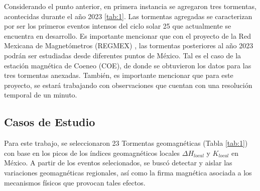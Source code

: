 \documentclass[preprint,12pt]{article}
\begin{document}
Considerando el punto anterior, en primera instancia se agregaron tres tormentas, acontecidas durante el año 2023 \ref{tab:1}. Las tormentas agregadas se caracterizan por ser los primeros eventos intensos del ciclo solar 25 que actualmente se encuentra en desarrollo. Es importante mencionar que con el proyecto de la Red Mexicana de Magnetómetros (REGMEX) \cite{corona2024}, las tormentas posteriores al año 2023 podrán ser estudiadas desde diferentes puntos de México. Tal es el caso de la estación magnética de Coeneo (COE), de donde se obtuvieron los datos para las tres tormentas anexadas. También, es importante mencionar que para este proyecto, se estará trabajando con observaciones que cuentan con una resolución temporal de un minuto.\\ 

\subsection{Casos de Estudio}
\label{SS:2-1}


Para este trabajo, se seleccionaron 23 Tormentas geomagnéticas (Tabla \ref{tab:1}) con base en los picos de los índices geomagnéticos locales $\Delta H_{local}$ y $K_{local}$ en México. A partir de los eventos selecionados, se buscó detectar y aislar las variaciones geomagnéticas regionales, así como la firma magnética asociada a los mecanismos físicos que provocan tales efectos. \\
\end{document}
